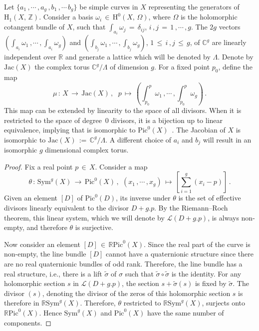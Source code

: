 \documentclass{article}
\theoremstyle{remark}
\begin{document}
Let $\{a_1\, ,\cdots\, , a_g\, , b_1\, , \cdots\, b_g\}$ be simple curves in $X$
representing the generators of 
$\mathrm{H}_1(X,\, \mathbb{Z})$. Consider a basis $\omega_i\,\in\, \mathrm{H}^0(X,\,
\Omega)$, where $\Omega$ is the holomorphic cotangent bundle of $X$, such that 
$\int_{a_i} \omega_j\,=\,\delta_{ij}$, $i\, ,j\,=\,1\, ,\cdots\, ,g$. The $2g$ vectors
$(\int_{a_i}\omega_1\, , \cdots\, , \int_{a_i} \omega_g)$ and $(\int_{b_j} \omega_1\, , 
\cdots\, , \int_{b_j} \omega_g)$, $1\,\leq\, i\, , j\,\leq\, g$, of $\mathbb{C}^g$ are 
linearly independent over $\mathbb{R}$ and generate a lattice which will be denoted by 
$\Lambda$. Denote by $\mathrm{Jac}(X)$ the complex torus $\mathbb{C}^g/\Lambda$ of
dimension $g$. 
For a fixed point $p_0$, define the map
$$\mu\, :\, X\,\longrightarrow\, \mathrm{Jac}(X)\, ,\,\  ~ 
p\,\longmapsto\, (\int_{p_0}^p \omega_1\, , \cdots\, , \int_{p_0}^p 
\omega_g)\, .$$ This map can be extended by linearity to the space of all divisors. When it 
is restricted to the space of degree~0 divisors, it is a bijection up to linear 
equivalence, implying that is isomorphic to $\mathrm{Pic}^0(X)$~\cite{arbarello1985geometry}. The Jacobian of $X$ is 
isomorphic to $\mathrm{Jac}(X)\,:=\,\mathbb{C}^g/\Lambda$. A different choice of $a_i$ and 
$b_j$ will result in an isomorphic $g$ dimensional complex torus.

\begin{proof}
  Fix a real point $p\,\in\, X$. Consider a map $$\theta\,:\, \mathrm{Sym}^g(X) \,\longrightarrow\, \mathrm{Pic}^0(X)
\, ,\,\ (x_1\, ,\cdots\, ,x_g) \,\longmapsto\, [\displaystyle\sum_{i=1}^g (x_i-p)]\, .$$ Given an element $[D]$
of  $\mathrm{Pic}^0(D)$, its inverse under $\theta$ is the set of effective divisors linearly equivalent to the 
divisor $D+g.p$. By the Riemann--Roch theorem, this linear system, which we will denote by $\mathcal{L}(D+g.p)$, is always
non-empty, and therefore $\theta$ is surjective.

Now consider an element $[D]\,\in\, \mathbb{R}\mathrm{Pic}^0(X)$. Since the real 
part of the curve is non-empty, the line bundle $[D]$ cannot have a quaternionic 
structure since there are no real quaternionic bundles of odd rank. Therefore, the 
line bundle has a real structure, i.e., there is a lift $\widetilde{\sigma}$ of 
$\sigma$ such that $\widetilde{\sigma} \circ \widetilde{\sigma}$ is the identity. 
For any holomorphic section $s$ in $\mathcal{L}(D+g.p)$, the section 
$s+\widetilde{\sigma}(s)$ is fixed by $\widetilde{\sigma}$. The divisor $(s)$, 
denoting the divisor of the zeros of this holomorphic section $s$ is therefore in 
$\mathbb{R}\mathrm{Sym}^{g}(X)$. Therefore, $\theta$ restricted to 
$\mathbb{R}\mathrm{Sym}^{g}(X)$, surjects onto $\mathbb{R}\mathrm{Pic}^0(X)$. Hence 
$\mathrm{Sym}^g(X)$ and $\mathrm{Pic}^0(X)$ have the same number of components.
\end{proof}
\end{document}
